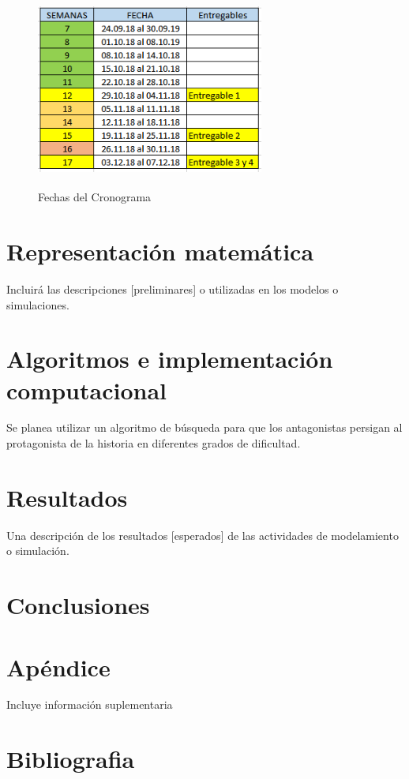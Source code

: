 \documentclass[a4paper]{article}
\begin{document}
\begin{figure}
	\centering
	\includegraphics[width=7.5cm,height=6.5cm]{Cronograma_2.PNG}
	\caption{Fechas del Cronograma}
	\label{FI1_6}
\end{figure}



\pagebreak

\section{Representación matemática}
Incluirá las descripciones [preliminares] o utilizadas en los
modelos o simulaciones.
\section{Algoritmos e implementación computacional}
Se planea utilizar un algoritmo de búsqueda para que los antagonistas persigan al protagonista de la historia en diferentes grados de dificultad.
\section{Resultados}
Una descripción de los resultados [esperados] de las actividades de
modelamiento o simulación.
\section{Conclusiones}

\section{Apéndice}
Incluye información suplementaria
\section{Bibliografia}
\end{document}
